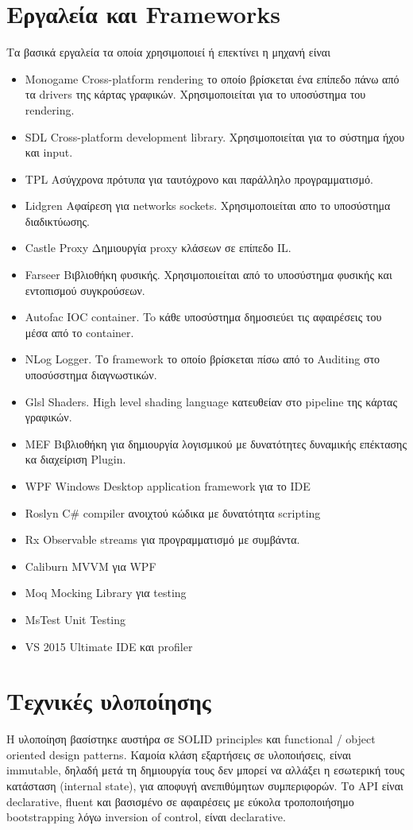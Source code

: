 \section{Εργαλεία και Frameworks}
Τα βασικά εργαλεία τα οποία χρησιμοποιεί ή επεκτίνει η μηχανή είναι
\begin{itemize}
	\item{Monogame} Cross-platform rendering το οποίο βρίσκεται ένα επίπεδο πάνω από τα drivers της κάρτας γραφικών. Χρησιμοποιείται για το υποσύστημα του rendering.
	\item{SDL} Cross-platform development library. Χρησιμοποιείται για το σύστημα ήχου και input.
	\item{TPL} Ασύγχρονα πρότυπα για ταυτόχρονο και παράλληλο προγραμματισμό.
	\item{Lidgren} Αφαίρεση για networks sockets. Χρησιμοποιείται απο το υποσύστημα διαδικτύωσης.
	\item{Castle Proxy} Δημιουργία proxy κλάσεων σε επίπεδο IL.
	\item{Farseer} Βιβλιοθήκη φυσικής. Χρησιμοποιείται από το υποσύστημα φυσικής και εντοπισμού συγκρούσεων.
	\item{Autofac} IOC container. To κάθε υποσύστημα δημοσιεύει τις αφαιρέσεις του μέσα από το container.
	\item{NLog} Logger. Το framework το οποίο βρίσκεται πίσω από το Auditing στο υποσύσστημα διαγνωστικών.
	\item{Glsl} Shaders. High level shading language κατευθείαν στο pipeline της κάρτας γραφικών.
	\item{MEF} Βιβλιοθήκη για δημιουργία λογισμικού με δυνατότητες δυναμικής επέκτασης κα διαχείριση Plugin.
	\item{WPF} Windows Desktop application framework για το IDE
	\item{Roslyn} C\# compiler ανοιχτού κώδικα με δυνατότητα scripting
	\item{Rx} Observable streams για προγραμματισμό με συμβάντα.
	\item{Caliburn} MVVM για WPF
	\item{Moq} Mocking Library για testing
	\item{MsTest} Unit Testing 
	\item{VS 2015 Ultimate} IDE και profiler
\end{itemize}

\section{Τεχνικές υλοποίησης}
Η υλοποίηση βασίστηκε αυστήρα σε SOLID principles και functional / object oriented design patterns.  Καμοία κλάση εξαρτήσεις σε υλοποιήσεις, είναι immutable, δηλαδή μετά τη δημιουργία τους δεν μπορεί να αλλάξει η εσωτερική τους κατάσταση (internal state), για αποφυγή ανεπιθύμητων συμπεριφορών. Το API είναι declarative, fluent και βασισμένο σε αφαιρέσεις με εύκολα τροποποιήσημο bootstrapping λόγω inversion of control, είναι declarative.

